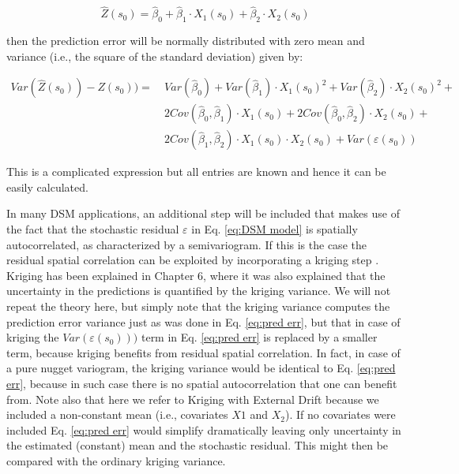 \documentclass[10pt,b5paper,]{book}
\theoremstyle{definition}
\theoremstyle{definition}
\theoremstyle{definition}
\theoremstyle{remark}
\begin{document}
\begin{equation}
\label{eq:cal regmodel}
\hat{Z}(s_0) = \hat{\beta}_0 + \hat{\beta}_1  \cdot X_1 (s_0) +  \hat{\beta}_2 \cdot X_2 (s_0)
\end{equation}

then the prediction error will be normally distributed with zero mean
and variance (i.e., the square of the standard deviation) given by:

\begin{equation}
\begin{aligned}
\label{eq:pred err}
Var(\hat{Z}(s_0)) - Z(s_0)) = & \ Var(\hat{\beta}_0) + Var(\hat{\beta}_1)  \cdot X_1 (s_0)^2 +  Var(\hat{\beta}_2) \cdot X_2 (s_0)^2 + \\
                      & \ 2 Cov(\hat{\beta}_0,\hat{\beta}_1) \cdot  X_1 (s_0) + 2 Cov(\hat{\beta}_0,\hat{\beta}_2) \cdot X_2 (s_0) + \\
                      & \ 2 Cov(\hat{\beta}_1,\hat{\beta}_2) \cdot  X_1 (s_0) \cdot  X_2 (s_0) + Var(\varepsilon(s_0))
\end{aligned}
\end{equation}

This is a complicated expression but all entries are known and hence it
can be easily calculated.

In many DSM applications, an additional step will be included that makes
use of the fact that the stochastic residual \({\varepsilon}\) in Eq.
\ref{eq:DSM model} is spatially autocorrelated, as characterized by a
semivariogram. If this is the case the residual spatial correlation can
be exploited by incorporating a kriging step \citep{hengl2004generic}.
Kriging has been explained in Chapter 6, where it was also explained
that the uncertainty in the predictions is quantified by the kriging
variance. We will not repeat the theory here, but simply note that the
kriging variance computes the prediction error variance just as was done
in Eq. \ref{eq:pred err}, but that in case of kriging the
\({Var(\varepsilon(s_0)))}\) term in Eq. \ref{eq:pred err} is replaced
by a smaller term, because kriging benefits from residual spatial
correlation. In fact, in case of a pure nugget variogram, the kriging
variance would be identical to Eq. \ref{eq:pred err}, because in such
case there is no spatial autocorrelation that one can benefit from. Note
also that here we refer to Kriging with External Drift because we
included a non-constant mean (i.e., covariates \({X1}\) and \({X_2}\)).
If no covariates were included Eq. \ref{eq:pred err} would simplify
dramatically leaving only uncertainty in the estimated (constant) mean
and the stochastic residual. This might then be compared with the
ordinary kriging variance.
\end{document}
